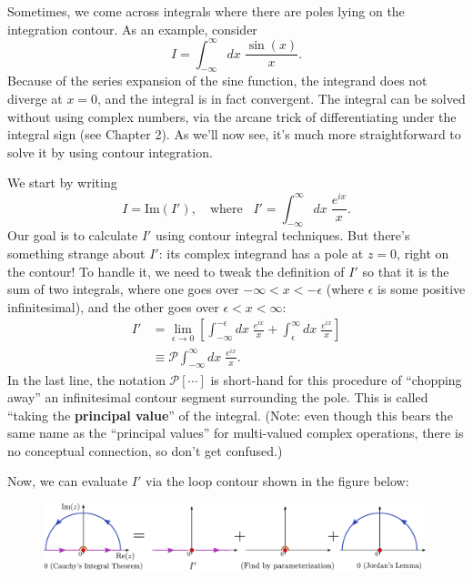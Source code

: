 \documentclass[10pt,a4paper]{article}
\begin{document}
Sometimes, we come across integrals where there are poles lying on the
integration contour. As an example, consider
\begin{equation}
I = \int_{-\infty}^\infty dx\; \frac{\sin(x)}{x}.
\end{equation}
Because of the series expansion of the sine function, the integrand
does not diverge at $x = 0$, and the integral is in fact
convergent. The integral can be solved without using complex numbers,
via the arcane trick of differentiating under the integral sign (see
Chapter 2). As we'll now see, it's much more straightforward to solve
it by using contour integration.

We start by writing
\begin{equation}
I = \mathrm{Im}(I'), \quad \mathrm{where}\;\;\; I' = \int_{-\infty}^\infty dx\; \frac{e^{ix}}{x}.
\end{equation}
Our goal is to calculate $I'$ using contour integral techniques. But
there's something strange about $I'$: its complex integrand has a pole
at $z = 0$, right on the contour! To handle it, we need to tweak the
definition of $I'$ so that it is the sum of two integrals, where one
goes over $-\infty < x < -\epsilon$ (where $\epsilon$ is some
positive infinitesimal), and the other goes over
$\epsilon < x < \infty$:
\begin{align}
  I' &= \lim_{\epsilon \rightarrow 0} \left[ \int_{-\infty}^{-\epsilon} dx\; \frac{e^{ix}}{x} + \int_{\epsilon}^\infty dx\; \frac{e^{ix}}{x}\right] \\ &\equiv \mathcal{P} \int_{-\infty}^\infty dx\; \frac{e^{ix}}{x}.
\end{align}
In the last line, the notation $\mathcal{P}[\cdots]$ is short-hand for
this procedure of ``chopping away'' an infinitesimal contour segment
surrounding the pole. This is called ``taking the \textbf{principal
  value}'' of the integral. (Note: even though this bears the same
name as the ``principal values'' for multi-valued complex operations,
there is no conceptual connection, so don't get confused.)

Now, we can evaluate $I'$ via the loop contour shown in the figure
below:

\begin{figure}[h]
  \centering\includegraphics[width=0.99\textwidth]{contour_example4}
\end{figure}
\end{document}
